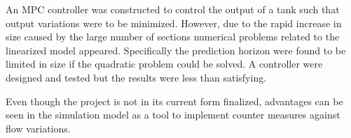 
An MPC controller was constructed to control the output of a tank such that output variations were to be minimized. However, due to the rapid increase in size caused by the large number of sections numerical problems related to the linearized model appeared. Specifically the prediction horizon were found to be limited in size if the quadratic problem could be solved.
A controller were designed and tested but the results were less than satisfying.


Even though the project is not in its current form finalized, advantages can be seen in the simulation model as a tool to implement counter measures against flow variations. 





